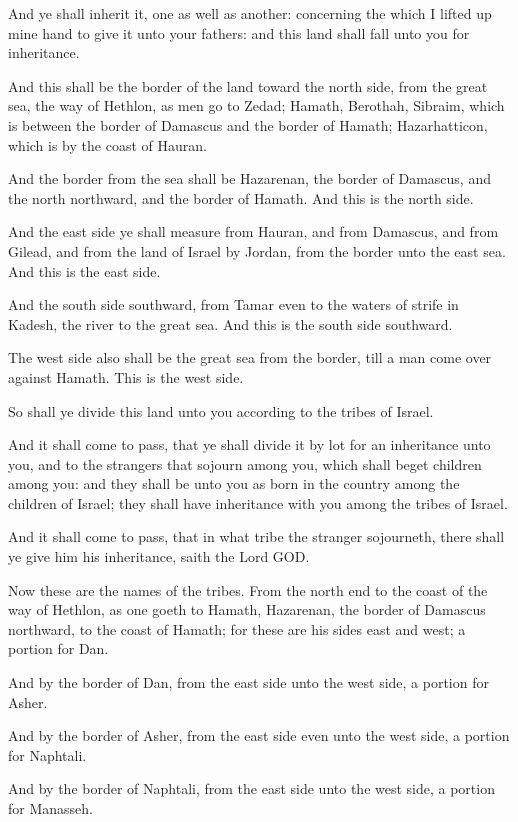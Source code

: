 \Verse And ye shall inherit it, one as well as another: concerning the which I lifted up mine hand to give it unto your fathers: and this land shall fall unto you for inheritance.

\Verse And this shall be the border of the land toward the north side, from the great sea, the way of Hethlon, as men go to Zedad; \Verse Hamath, Berothah, Sibraim, which is between the border of Damascus and the border of Hamath; Hazarhatticon, which is by the coast of Hauran.

\Verse And the border from the sea shall be Hazarenan, the border of Damascus, and the north northward, and the border of Hamath. And this is the north side.

\Verse And the east side ye shall measure from Hauran, and from Damascus, and from Gilead, and from the land of Israel by Jordan, from the border unto the east sea. And this is the east side.

\Verse And the south side southward, from Tamar even to the waters of strife in Kadesh, the river to the great sea. And this is the south side southward.

\Verse The west side also shall be the great sea from the border, till a man come over against Hamath. This is the west side.

\Verse So shall ye divide this land unto you according to the tribes of Israel.

\Verse And it shall come to pass, that ye shall divide it by lot for an inheritance unto you, and to the strangers that sojourn among you, which shall beget children among you: and they shall be unto you as born in the country among the children of Israel; they shall have inheritance with you among the tribes of Israel.

\Verse And it shall come to pass, that in what tribe the stranger sojourneth, there shall ye give him his inheritance, saith the Lord GOD.


\Chapter
\Verse Now these are the names of the tribes. From the north end to the coast of the way of Hethlon, as one goeth to Hamath, Hazarenan, the border of Damascus northward, to the coast of Hamath; for these are his sides east and west; a portion for Dan.

\Verse And by the border of Dan, from the east side unto the west side, a portion for Asher.

\Verse And by the border of Asher, from the east side even unto the west side, a portion for Naphtali.

\Verse And by the border of Naphtali, from the east side unto the west side, a portion for Manasseh.

